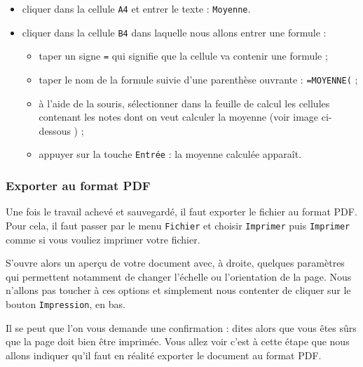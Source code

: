 \begin{itemize}
\item cliquer dans la cellule \texttt{A4} et entrer le texte : \texttt{Moyenne}. 
\item cliquer dans la cellule \texttt{B4} dans laquelle nous allons entrer une formule : 
        \begin{itemize}
        \item taper un signe \texttt{=} qui signifie que la cellule va contenir une formule ;
        \item taper le nom de la formule suivie d'une parenthèse ouvrante : \texttt{=MOYENNE(} ;
        \item à l'aide de la souris, sélectionner dans la feuille de calcul les cellules contenant les notes dont on veut calculer la moyenne (voir image ci-dessous ) ;
        \item appuyer sur la touche \texttt{Entrée} : la moyenne calculée apparaît.
        \end{itemize}
\end{itemize}



\subsubsection{Exporter au format PDF}

Une fois le travail achevé et sauvegardé, il faut exporter le fichier au format PDF. Pour cela, il faut passer par le menu \texttt{Fichier} et choisir \texttt{Imprimer}  puis \texttt{Imprimer}  comme si vous vouliez imprimer votre fichier.


S'ouvre alors un aperçu de votre document avec, à droite, quelques paramètres qui permettent notamment de changer l'échelle ou l'orientation de la page. Nous n'allons pas toucher à ces options et simplement nous contenter de cliquer sur le bouton \texttt{Impression}, en bas.


Il se peut que l'on vous demande une confirmation : dites alors que vous êtes sûrs que la page doit bien être imprimée. Vous allez voir c'est à cette étape que nous allons indiquer qu'il faut en réalité exporter le document au format PDF.

